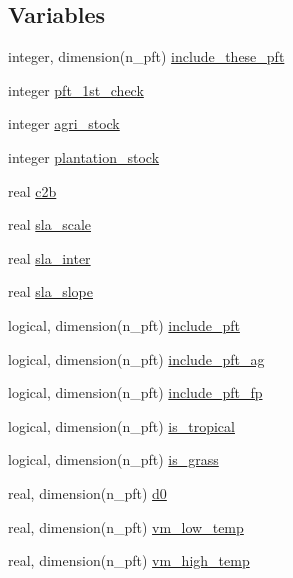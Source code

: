 \subsection*{Variables}
\begin{DoxyCompactItemize}
\item 
integer, dimension(n\+\_\+pft) \hyperlink{namespacepft__coms_a7ab2f215846d8f15e70deeb77fa8802e}{include\+\_\+these\+\_\+pft}
\item 
integer \hyperlink{namespacepft__coms_a46f15da0b9bf81a4f8bdba850efff1c8}{pft\+\_\+1st\+\_\+check}
\item 
integer \hyperlink{namespacepft__coms_afa924efff5f6897a77ef72109bfb8811}{agri\+\_\+stock}
\item 
integer \hyperlink{namespacepft__coms_abade08057c8846615ec5ff4ff9d3ffa2}{plantation\+\_\+stock}
\item 
real \hyperlink{namespacepft__coms_a2613e7dd1fa05af83d058d81f92946ec}{c2b}
\item 
real \hyperlink{namespacepft__coms_a1ba9e47e49347dca3d82a5d2a694136d}{sla\+\_\+scale}
\item 
real \hyperlink{namespacepft__coms_a7f2175fb500b1a4a0558108744ef6da8}{sla\+\_\+inter}
\item 
real \hyperlink{namespacepft__coms_abac97f719f7239eac0e2ad92dc9a8bef}{sla\+\_\+slope}
\item 
logical, dimension(n\+\_\+pft) \hyperlink{namespacepft__coms_a01416a40237dfc9b75e2205ff91ef2be}{include\+\_\+pft}
\item 
logical, dimension(n\+\_\+pft) \hyperlink{namespacepft__coms_a39d76f589c044b393db74ff7392193c7}{include\+\_\+pft\+\_\+ag}
\item 
logical, dimension(n\+\_\+pft) \hyperlink{namespacepft__coms_adc76e53cf81aef56357b589214fd3700}{include\+\_\+pft\+\_\+fp}
\item 
logical, dimension(n\+\_\+pft) \hyperlink{namespacepft__coms_ae26d357a418f5441d136c81e335cd633}{is\+\_\+tropical}
\item 
logical, dimension(n\+\_\+pft) \hyperlink{namespacepft__coms_a74313e4ba2eb3134ae662a573ee862e4}{is\+\_\+grass}
\item 
real, dimension(n\+\_\+pft) \hyperlink{namespacepft__coms_aafd962aec98e7e8c1cfefd6543409bd5}{d0}
\item 
real, dimension(n\+\_\+pft) \hyperlink{namespacepft__coms_abc805ab81f6ae61cf4ccfb36fd352fdc}{vm\+\_\+low\+\_\+temp}
\item 
real, dimension(n\+\_\+pft) \hyperlink{namespacepft__coms_a847c455daab9b125944dd2057d418b6c}{vm\+\_\+high\+\_\+temp}

\end{DoxyCompactItemize}
